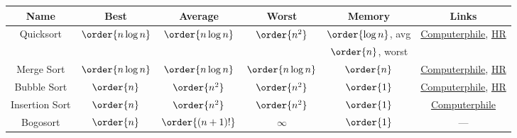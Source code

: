 \begin{tabular}{c c c c c c}
\hline
Name & Best & Average & Worst & Memory & Links \\
\hline
\hline
\multirow{2}{*}{Quicksort} & \multirow{2}{*}{$\order{n \log{n}}$} & \multirow{2}{*}{$\order{n \log{n}}$} & \multirow{2}{*}{$\order{n^{2}}$} & $\order{\log{n}}$, avg & \multirow{2}{*}{\href{https://youtu.be/XE4VP_8Y0BU}{Computerphile}, \href{https://youtu.be/SLauY6PpjW4}{HR}} \\
 & & & & $\order{n}$, worst & \\
Merge Sort & $\order{n \log{n}}$ & $\order{n \log{n}}$ & $\order{n \log{n}}$ & $\order{n}$ & \href{https://youtu.be/kgBjXUE_Nwc}{Computerphile}, \href{https://youtu.be/KF2j-9iSf4Q}{HR} \\
Bubble Sort & $\order{n}$ & $\order{n^{2}}$ & $\order{n^{2}}$ & $\order{1}$ & \href{https://youtu.be/kgBjXUE_Nwc}{Computerphile}, \href{https://youtu.be/6Gv8vg0kcHc}{HR} \\
Insertion Sort & $\order{n}$ & $\order{n^{2}}$ & $\order{n^{2}}$ & $\order{1}$ & \href{https://youtu.be/pcJHkWwjNl4}{Computerphile} \\
Bogosort & $\order{n}$ & $\order{\left(n+1\right)!}$ & $\infty$ & $\order{1}$ & --- \\
\hline
\end{tabular}

